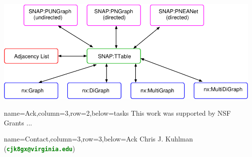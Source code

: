 \documentclass[landscape,paperwidth=70in,paperheight=46in,fontscale=0.225]{baposter} %
\begin{document}
\begin{poster}
{\begin{minipage}{0.45\linewidth}
\end{minipage}
\begin{center}
\includegraphics[scale=0.5]{figures/star_trans.pdf}
\end{center}

}

          {name=Ack,column=3,row=2,below=tasks}{
{\footnotesize
This work was supported by NSF
Grants ...
}
}

          {name=Contact,column=3,row=3,below=Ack}{
{\footnotesize
{Chris J. Kuhlman~ (\textcolor{green}{\textbf{\texttt{cjk8gx@virginia.edu}}})}
}}

\end{poster}
\end{document}
